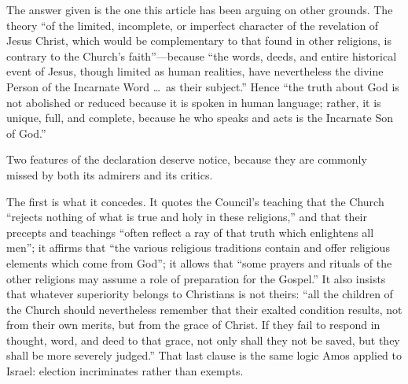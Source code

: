 The answer given is the one this article has been arguing on other grounds. The theory ``of the limited, incomplete, or imperfect character of the revelation of Jesus Christ, which would be complementary to that found in other religions, is contrary to the Church's faith''---because ``the words, deeds, and entire historical event of Jesus, though limited as human realities, have nevertheless the divine Person of the Incarnate Word \ldots\ as their subject.'' Hence ``the truth about God is not abolished or reduced because it is spoken in human language; rather, it is unique, full, and complete, because he who speaks and acts is the Incarnate Son of God.''

Two features of the declaration deserve notice, because they are commonly missed by both its admirers and its critics.

The first is what it concedes. It quotes the Council's teaching that the Church ``rejects nothing of what is true and holy in these religions,'' and that their precepts and teachings ``often reflect a ray of that truth which enlightens all men''; it affirms that ``the various religious traditions contain and offer religious elements which come from God''; it allows that ``some prayers and rituals of the other religions may assume a role of preparation for the Gospel.'' It also insists that whatever superiority belongs to Christians is not theirs: ``all the children of the Church should nevertheless remember that their exalted condition results, not from their own merits, but from the grace of Christ. If they fail to respond in thought, word, and deed to that grace, not only shall they not be saved, but they shall be more severely judged.'' That last clause is the same logic Amos applied to Israel: election incriminates rather than exempts.


